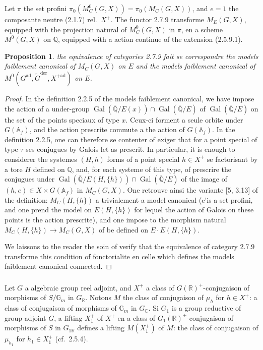 \documentclass[12pt,a4paper]{article}
\theoremstyle{plain}
\newtheorem{proposition}[theorem]{Proposition}
\theoremstyle{definition}
\theoremstyle{remark}
\DeclareMathOperator{\Gal}{Gal}
\newcommand{\QQ}{\mathbb{Q}}
\newcommand{\RR}{\mathbb{R}}
\newcommand{\CC}{\mathbb{C}}
\newcommand{\Af}{\mathbb{A}_f}
\newcommand{\Gm}{\mathbb{G}}
\begin{document}
Let $\pi$ the set profini $\pi_0(M^0_C(G,X)) = \pi_0(M_C(G,X))$, and $e = 1$ the composante neutre (2.1.7) rel.~$X^+$. The functor 2.7.9 transforme $M_E(G,X)$, equipped with the projection natural of $M^0_C(G,X)$ in $\pi$, en a scheme $M^0(G,X)$ on $\overline{\QQ}$, equipped with a action continue of the extension (2.5.9.1).

\begin{proposition}
the equivalence of categories 2.7.9 fait se correspondre the models faiblement canonical of $M_C(G,X)$ on $E$ and the models faiblement canonical of $M^0(G^{\text{ad}}, \tilde{G}^{\text{der}}, X^{+\text{ad}})$ on $E$.
\end{proposition}

\begin{proof}
In the definition 2.2.5 of the models faiblement canonical, we have impose the action of a under-group $\Gal(\overline{\QQ}/E(x)) \cap \Gal(\overline{\QQ}/E)$ of $\Gal(\overline{\QQ}/E)$ on the set of the points speciaux of type $x$. Ceux-ci forment a seule orbite under $G(\Af)$, and the action prescrite commute a the action of $G(\Af)$. In the definition 2.2.5, one can therefore se contenter of exiger that for a point special of type $\tau$ ses conjugues by Galois let as prescrit. In particular, it is enough to considerer the systemes $(H,h)$ forms of a point special $h \in X^+$ se factorisant by a tore $H$ defined on $\QQ$, and, for each systeme of this type, of prescrire the conjugues under $\Gal(\overline{\QQ}/E(H,\{h\})) \cap \Gal(\overline{\QQ}/E)$ of the image of $(h,e) \in X \times G(\Af)$ in $M_C(G,X)$. One retrouve ainsi the variante [5, 3.13] of the definition: $M_C(H,\{h\})$ a trivialement a model canonical (c'is a set profini, and one prend the model on $E(H,\{h\})$ for lequel the action of Galois on these points is the action prescrite), and one impose to the morphism natural $M_C(H,\{h\}) \to M_C(G,X)$ of be defined on $E \cdot E(H,\{h\})$.

We laissons to the reader the soin of verify that the equivalence of category 2.7.9 transforme this condition of fonctorialite en celle which defines the models faiblement canonical connected.
\end{proof}

\subsubsection{}

Let $G$ a algebraic group reel adjoint, and $X^+$ a class of $G(\RR)^+$-conjugaison of morphisms of $S/\Gm_m$ in $G_{\RR}$. Notons $M$ the class of conjugaison of $\mu_h$ for $h \in X^+$: a class of conjugaison of morphisms of $\Gm_m$ in $G_{\CC}$. Si $G_1$ is a group reductive of group adjoint $G$, a lifting $X_1^+$ of $X^+$ en a class of $G_1(\RR)^+$-conjugaison of morphisms of $S$ in $G_{1\RR}$ defines a lifting $M(X_1^+)$ of $M$: the class of conjugaison of $\mu_{h_1}$ for $h_1 \in X_1^+$ (cf.~2.5.4).
\end{document}
